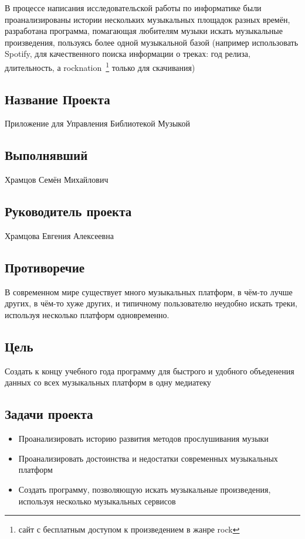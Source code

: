 \Introduction

В процессе написания исследовательской работы по информатике были проанализированы истории нескольких музыкальных площадок разных времён, разработана программа, помагающая любителям музыки искать музыкальные произведения, пользуясь более одной музыкальной базой (например использовать Spotify, для качественного поиска информации о треках: год релиза, длительность, а rocknation~\footnote{сайт с бесплатным доступом к произведением в жанре rock} только для скачивания)

\subsection{Название Проекта}
Приложение для Управления Библиотекой Музыкой

\subsection{Выполнявший}
Храмцов Семён Михайлович

\subsection{Руководитель проекта}
Храмцова Евгения Алексеевна

\subsection{Противоречие}

В современном мире существует много музыкальных платформ, в чём-то лучше других, в чём-то хуже других, и типичному пользователю неудобно искать треки, используя несколько платформ одновременно.

\subsection{Цель}
Создать к концу учебного года программу для быстрого и удобного
объеденения данных со всех музыкальных платформ в одну медиатеку

\subsection{Задачи проекта}

\begin{itemize}
\item
  Проанализировать историю развития методов прослушивания музыки
\item
  Проанализировать достоинства и недостатки современных музыкальных платформ
\item
  Создать программу, позволяющую искать музыкальные произведения, используя несколько музыкальных сервисов
\end{itemize}


